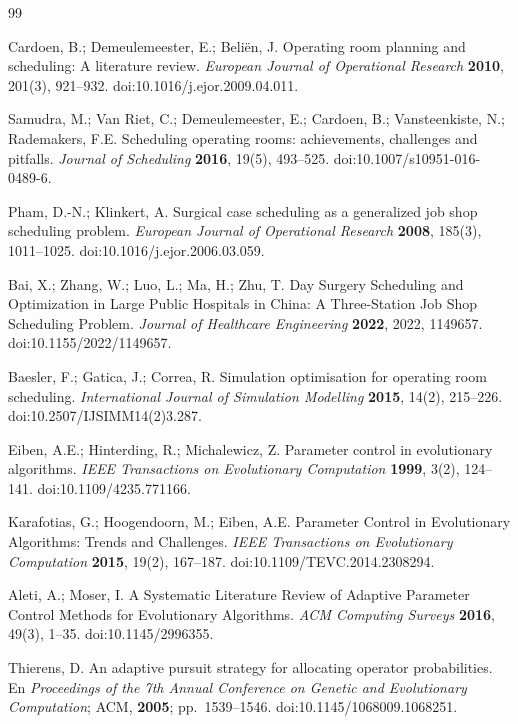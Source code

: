 \documentclass[10pt,a4paper]{article}
\begin{document}
\begin{thebibliography}{99}\small
\setlength{\itemsep}{2pt}

 Cardoen, B.; Demeulemeester, E.; Beliën, J. Operating room planning and
scheduling: A literature review. \emph{European Journal of Operational Research} \textbf{2010},
201(3), 921--932. doi:10.1016/j.ejor.2009.04.011.

 Samudra, M.; Van Riet, C.; Demeulemeester, E.; Cardoen, B.; Vansteenkiste, N.;
Rademakers, F.E. Scheduling operating rooms: achievements, challenges and pitfalls.
\emph{Journal of Scheduling} \textbf{2016}, 19(5), 493--525. doi:10.1007/s10951-016-0489-6.

 Pham, D.-N.; Klinkert, A. Surgical case scheduling as a generalized job shop
scheduling problem. \emph{European Journal of Operational Research} \textbf{2008}, 185(3),
1011--1025. doi:10.1016/j.ejor.2006.03.059.

 Bai, X.; Zhang, W.; Luo, L.; Ma, H.; Zhu, T. Day Surgery Scheduling and
Optimization in Large Public Hospitals in China: A Three-Station Job Shop Scheduling Problem.
\emph{Journal of Healthcare Engineering} \textbf{2022}, 2022, 1149657. doi:10.1155/2022/1149657.

 Baesler, F.; Gatica, J.; Correa, R. Simulation optimisation for operating room
scheduling. \emph{International Journal of Simulation Modelling} \textbf{2015}, 14(2), 215--226.
doi:10.2507/IJSIMM14(2)3.287.

 Eiben, A.E.; Hinterding, R.; Michalewicz, Z. Parameter control in evolutionary
algorithms. \emph{IEEE Transactions on Evolutionary Computation} \textbf{1999}, 3(2), 124--141.
doi:10.1109/4235.771166.

 Karafotias, G.; Hoogendoorn, M.; Eiben, A.E. Parameter Control in
Evolutionary Algorithms: Trends and Challenges. \emph{IEEE Transactions on Evolutionary
Computation} \textbf{2015}, 19(2), 167--187. doi:10.1109/TEVC.2014.2308294.

 Aleti, A.; Moser, I. A Systematic Literature Review of Adaptive Parameter
Control Methods for Evolutionary Algorithms. \emph{ACM Computing Surveys} \textbf{2016}, 49(3),
1--35. doi:10.1145/2996355.

 Thierens, D. An adaptive pursuit strategy for allocating operator
probabilities. En \emph{Proceedings of the 7th Annual Conference on Genetic and Evolutionary
Computation}; ACM, \textbf{2005}; pp.~1539--1546. doi:10.1145/1068009.1068251.


\end{thebibliography}
\end{document}

